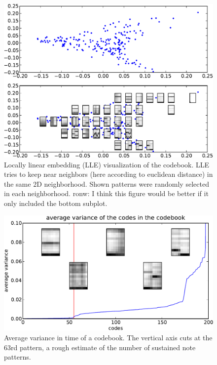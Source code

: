 \documentclass{article}
\begin{document}
\begin{figure}[htb]
\begin{center}
\includegraphics[width=.9\columnwidth]{codes_lle}
\end{center}
\caption{\small{
Locally linear embedding (LLE) visualization of the codebook.
LLE tries to keep near neighbors (here according to euclidean distance)
in the same $2$D neighborhood. Shown patterns were randomly selected
in each neighborhood.
}
ronw: I think this figure would be better if it only included the
bottom subplot.
}
\label{fig:lle}
\end{figure}

\begin{figure}[htb]
\begin{center}
\includegraphics[width=.9\columnwidth]{code_variance}
\end{center}
\caption{\small{Average variance in time of a codebook. The vertical
axis cuts at the $63$rd pattern, a rough estimate of the number of 
sustained note patterns.
}}
\label{fig:code_var}
\end{figure}
\end{document}
